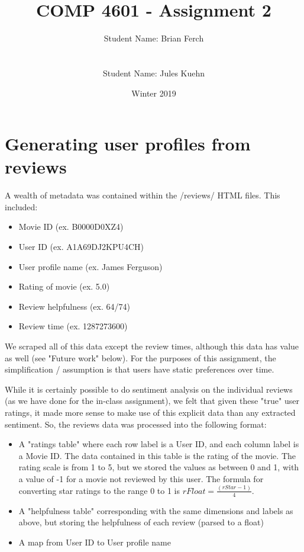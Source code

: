 \documentclass[11pt]{article}
\title{COMP 4601 - Assignment 2}
\author{Student Name: Brian Ferch\\
\text{Student Number: 100962115}\\\\ 
Student Name: Jules Kuehn\\
\text{Student Number: 100661464}}
\date{Winter 2019}
\begin{document}
\maketitle


\section{Generating user profiles from reviews}

A wealth of metadata was contained within the /reviews/ HTML files. This included:

\begin{itemize}
    \item Movie ID (ex. B0000D0XZ4)
    \item User ID (ex. A1A69DJ2KPU4CH)
    \item User profile name (ex. James Ferguson)
    \item Rating of movie (ex. 5.0)
    \item Review helpfulness (ex. 64/74)
    \item Review time (ex. 1287273600)
\end{itemize}

We scraped all of this data except the review times, although this data has value as well (see "Future work" below). For the purposes of this assignment, the simplification / assumption is that users have static preferences over time.\newline

While it is certainly possible to do sentiment analysis on the individual reviews (as we have done for the in-class assignment), we felt that given these "true" user ratings, it made more sense to make use of this explicit data than any extracted sentiment. So, the reviews data was processed into the following format:

\begin{itemize}
    \item A "ratings table" where each row label is a User ID, and each column label is a Movie ID. The data contained in this table is the rating of the movie. The rating scale is from 1 to 5, but we stored the values as between 0 and 1, with a value of -1 for a movie not reviewed by this user. The formula for converting star ratings to the range 0 to 1 is $rFloat = \frac{(rStar-1)}{4}$.
    \item A "helpfulness table" corresponding with the same dimensions and labels as above, but storing the helpfulness of each review (parsed to a float)
    \item A map from User ID to User profile name
\end{itemize}
\end{document}
